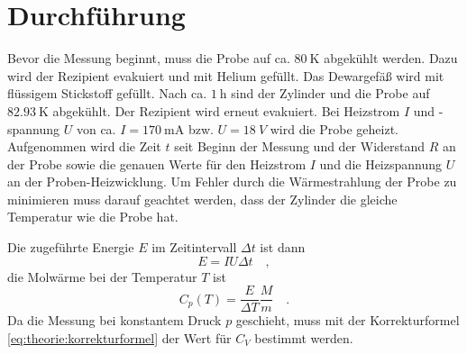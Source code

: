 

\section{Durchführung}
Bevor die Messung beginnt, muss die Probe auf ca. $\SI{80}{\kelvin}$
abgekühlt werden. Dazu wird der Rezipient evakuiert und mit Helium gefüllt. 
Das Dewargefäß wird mit
flüssigem Stickstoff gefüllt. Nach ca. $\SI{1}{\hour}$ sind der Zylinder und 
die Probe auf 
$\SI{82.93}{\kelvin}$ abgekühlt. Der Rezipient wird erneut evakuiert. Bei
Heizstrom $I$ und -spannung $U$ von ca. $I=\SI{170}{\milli \ampere}$ bzw. $U=\SI{18}{V}$ wird die Probe geheizt.
Aufgenommen wird die Zeit $t$ seit Beginn der Messung und der Widerstand $R$
an der Probe sowie die genauen Werte für den Heizstrom $I$ und die
Heizspannung $U$ an der Proben-Heizwicklung. Um Fehler durch die Wärmestrahlung der Probe zu minimieren muss darauf geachtet werden, dass der Zylinder 
die gleiche Temperatur wie die Probe hat.

Die zugeführte Energie $E$ im Zeitintervall $\Delta t$ ist dann
\begin{equation}
E = IU \Delta t  \quad ,
\end{equation}
die Molwärme bei der Temperatur $T$ ist
\begin{equation}
C_p (T) = \frac{E}{\Delta T} \frac{M}{m} \quad .
\label{eq:C_p}
\end{equation}
Da die Messung bei konstantem Druck $p$ geschieht, muss mit der Korrekturformel
\eqref{eq:theorie:korrekturformel} der Wert für $C_V$ bestimmt werden.

